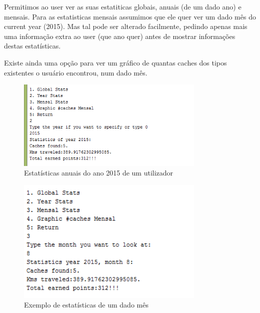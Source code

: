\documentclass{article}
\begin{document}
\par Permitimos ao user ver as suas estatiticas globais, anuais (de um dado ano) e mensais. Para as estatisticas mensais assumimos que ele quer ver um dado mês do current year (2015). Mas tal pode ser alterado facilmente, pedindo apenas mais uma informação extra ao user (que ano quer) antes de mostrar informações destas estatísticas.

\par Existe ainda uma opção para ver um gráfico de quantas caches dos tipos existentes o usuário encontrou, num dado mês.
\begin{figure}[ht!]
\centering
\includegraphics[width=90mm]{2015STATS.png}
\caption{Estatísticas anuais do ano 2015 de um utilizador}
\end{figure}
\begin{figure}[ht!]
\centering
\includegraphics[width=90mm]{statsmes.png}
\caption{Exemplo de estatísticas de um dado mês}
\end{figure}

\pagebreak
\end{document}
